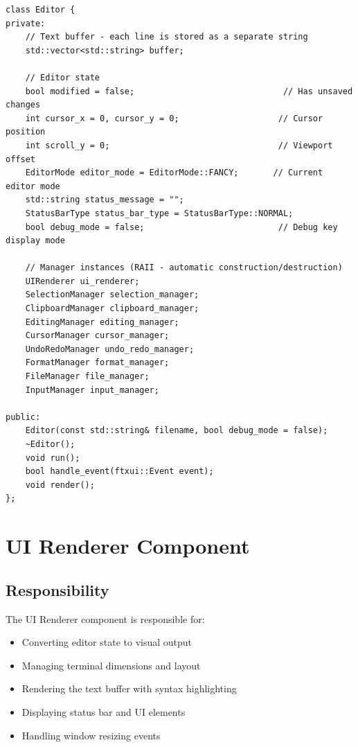 \documentclass[12pt,a4paper,oneside,openany]{report}
\begin{document}
\begin{lstlisting}
class Editor {
private:
    // Text buffer - each line is stored as a separate string
    std::vector<std::string> buffer;
    
    // Editor state
    bool modified = false;                              // Has unsaved changes
    int cursor_x = 0, cursor_y = 0;                    // Cursor position
    int scroll_y = 0;                                  // Viewport offset
    EditorMode editor_mode = EditorMode::FANCY;       // Current editor mode
    std::string status_message = "";
    StatusBarType status_bar_type = StatusBarType::NORMAL;
    bool debug_mode = false;                           // Debug key display mode
    
    // Manager instances (RAII - automatic construction/destruction)
    UIRenderer ui_renderer;
    SelectionManager selection_manager;
    ClipboardManager clipboard_manager;
    EditingManager editing_manager;
    CursorManager cursor_manager;
    UndoRedoManager undo_redo_manager;
    FormatManager format_manager;
    FileManager file_manager;
    InputManager input_manager;
    
public:
    Editor(const std::string& filename, bool debug_mode = false);
    ~Editor();
    void run();
    bool handle_event(ftxui::Event event);
    void render();
};
\end{lstlisting}

\section{UI Renderer Component}

\subsection{Responsibility}

The UI Renderer component is responsible for:

\begin{itemize}
	\item Converting editor state to visual output
	\item Managing terminal dimensions and layout
	\item Rendering the text buffer with syntax highlighting
	\item Displaying status bar and UI elements
	\item Handling window resizing events
\end{itemize}
\end{document}
